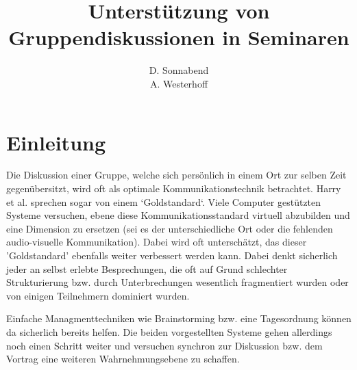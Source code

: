 \documentclass{seminarvorlage}
\begin{document}
\title{Unterstützung von Gruppendiskussionen in Seminaren}
\author{
  \alignauthor D. Sonnabend\\
  \alignauthor A. Westerhoff\\
}

\maketitle




\section{Einleitung}
Die Diskussion einer Gruppe, welche sich persönlich in einem Ort zur selben Zeit
gegenübersitzt, wird oft als optimale Kommunikationstechnik betrachtet. Harry et
al. \cite{HarGorSch2012} sprechen sogar von einem `Goldstandard`. Viele Computer
gestützten Systeme versuchen, ebene diese Kommunikationsstandard virtuell
abzubilden und eine Dimension zu ersetzen (sei es der unterschiedliche Ort oder
die fehlenden audio-visuelle Kommunikation). Dabei wird oft unterschätzt, das
dieser 'Goldstandard' ebenfalls weiter verbessert werden kann. Dabei denkt
sicherlich jeder an selbst erlebte Besprechungen, die oft auf Grund schlechter
Strukturierung bzw. durch Unterbrechungen wesentlich fragmentiert wurden oder
von einigen Teilnehmern dominiert wurden.

Einfache Managmenttechniken wie Brainstorming bzw. eine Tagesordnung können da
sicherlich bereits helfen. Die beiden vorgestellten Systeme gehen allerdings
noch einen Schritt weiter und versuchen synchron zur Diskussion bzw. dem Vortrag
eine weiteren Wahrnehmungsebene zu schaffen.
\end{document}
